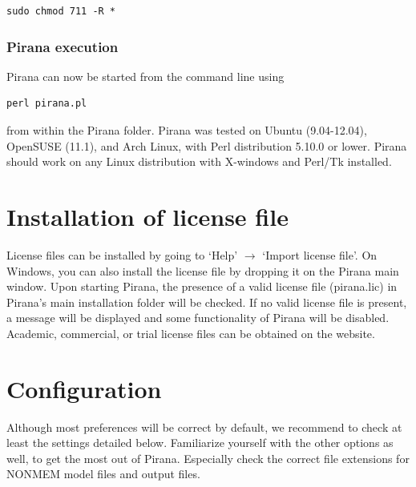 \begin{lstlisting}
sudo chmod 711 -R *
\end{lstlisting}

\subsubsection*{Pirana execution}
\noindent Pirana can now be started from the command line using

\begin{lstlisting}
perl pirana.pl
\end{lstlisting}

\noindent from within the Pirana folder. Pirana was tested on Ubuntu
(9.04-12.04), OpenSUSE (11.1), and Arch Linux, with Perl
distribution 5.10.0 or lower. Pirana should work on any Linux distribution
with X-windows and Perl/Tk installed.

\section{Installation of license file} License files can be installed by going to `Help' $\rightarrow$ `Import license file'. On Windows, you can also install the license file by dropping it on the Pirana main window. Upon starting Pirana, the presence of a valid license file (pirana.lic) in Pirana's main installation folder will be checked. If no valid license file is present, a message will be displayed and some functionality of Pirana will be
disabled. Academic, commercial, or trial license files can be obtained
on the website.

\section{Configuration} Although most preferences will
be correct by default, we recommend to check at least the
settings detailed below. Familiarize yourself with
the other options as well, to get the most out of Pirana. Especially check the correct file extensions
for NONMEM model files and output files.

